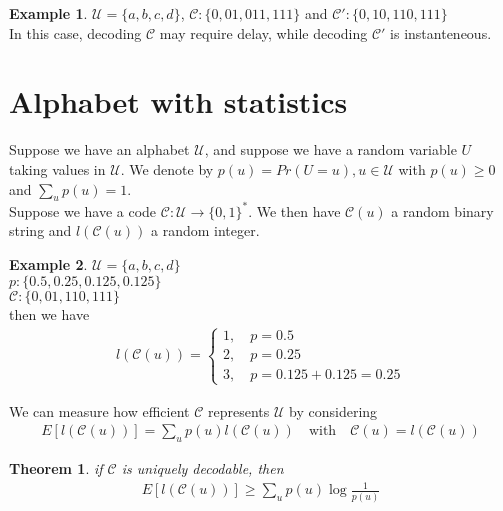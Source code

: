 \documentclass[twoside]{article}
\newtheorem{theorem}{Theorem}[section]
\theoremstyle{definition} %
\newtheorem{example}{Example}
\def\U{\mathcal{U}}
\def\C{\mathcal{C}}
\begin{document}
\begin{example}
  $\U = \{a, b, c, d\}$, $\C: \{0, 01, 011, 111\}$ and $\C': \{0, 10, 110, 111\}$\\
  In this case, decoding $\C$ may require delay, while decoding $\C'$ is instanteneous.
\end{example}


\cleardoublepage
\section{Alphabet with statistics}

Suppose we have an alphabet $\U$, and suppose we have a random variable $U$ taking values in $\U$. We denote by $p(u) = Pr(U = u), u \in \U$ with $p(u) \geq 0$ and $\sum_u p(u) = 1$.\\

Suppose we have a code $\C: \U \rightarrow \{0, 1\}^*$. We then have $\C(u)$ a random binary string and $l(\C(u))$ a random integer.

\begin{example}
  $\U = \{a, b, c, d\}$\\
  $p: \{0.5, 0.25, 0.125, 0.125\}$ \\
  $\C: \{0, 01, 110, 111\}$ \\

  then we have
  \begin{align*}
    l(\C(u)) =
    \left\{
      \begin{array}{l}
        1, \quad p = 0.5 \\
        2, \quad p = 0.25 \\
        3, \quad p = 0.125 + 0.125 = 0.25
      \end{array}
    \right.
  \end{align*}
\end{example}

We can measure how efficient $\C$ represents $\U$ by considering
\begin{align*}
  E[l(\C(u))] = \sum_u p(u)l(\C(u)) \quad \text{with} \quad \C(u) = l(\C(u))
\end{align*}

\begin{theorem}
  if $\C$ is uniquely decodable, then
  \begin{align*}
    E[l(\C(u))] \geq \sum_u p(u) \log \frac{1}{p(u)}
  \end{align*}
\end{theorem}
\end{document}
